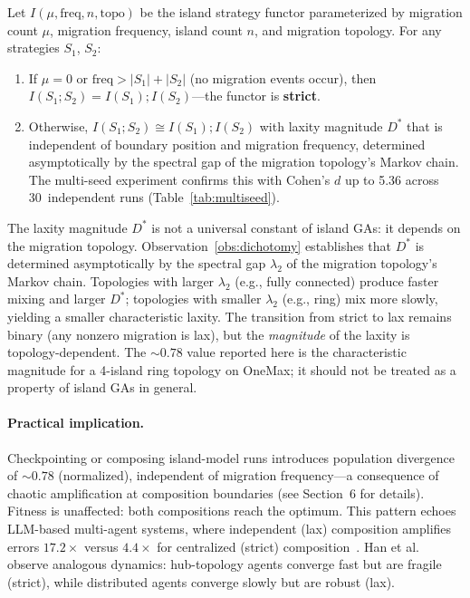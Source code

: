 \documentclass[sigconf,anonymous]{acmart}
\begin{document}
\begin{observation}
\label{obs:dichotomy}
Let $I(\mu, \mathrm{freq}, n, \mathrm{topo})$ be the island strategy functor parameterized by migration count $\mu$, migration frequency, island count $n$, and migration topology. For any strategies $S_1$, $S_2$:
\begin{enumerate}[nosep]
  \item If $\mu = 0$ or $\mathrm{freq} > |S_1| + |S_2|$ (no migration events occur), then $I(S_1 ; S_2) = I(S_1) ; I(S_2)$---the functor is \textbf{strict}.
  \item Otherwise, $I(S_1 ; S_2) \cong I(S_1) ; I(S_2)$ with laxity magnitude $D^*$ that is independent of boundary position and migration frequency, determined asymptotically by the spectral gap of the migration topology's Markov chain. The multi-seed experiment confirms this with Cohen's $d$ up to 5.36 across 30~independent runs (Table~\ref{tab:multiseed}).
\end{enumerate}
\end{observation}

\begin{remark}
\label{rem:laxator-topology}
The laxity magnitude $D^*$ is not a universal constant of island GAs: it depends on the migration topology. Observation~\ref{obs:dichotomy} establishes that $D^*$ is determined asymptotically by the spectral gap $\lambda_2$ of the migration topology's Markov chain. Topologies with larger $\lambda_2$ (e.g., fully connected) produce faster mixing and larger $D^*$; topologies with smaller $\lambda_2$ (e.g., ring) mix more slowly, yielding a smaller characteristic laxity. The transition from strict to lax remains binary (any nonzero migration is lax), but the \emph{magnitude} of the laxity is topology-dependent. The ${\sim}0.78$ value reported here is the characteristic magnitude for a 4-island ring topology on OneMax; it should not be treated as a property of island GAs in general.
\end{remark}

\paragraph{Practical implication.}
Checkpointing or composing island-model runs introduces population divergence of ${\sim}0.78$ (normalized), independent of migration frequency---a consequence of chaotic amplification at composition boundaries (see Section~6 for details). Fitness is unaffected: both compositions reach the optimum. This pattern echoes LLM-based multi-agent systems, where independent (lax) composition amplifies errors $17.2\times$ versus $4.4\times$ for centralized (strict) composition~\cite{kim2025scaling}. Han et al.~\cite{han2026conformity} observe analogous dynamics: hub-topology agents converge fast but are fragile (strict), while distributed agents converge slowly but are robust (lax).
\end{document}
